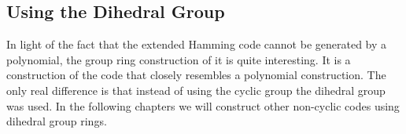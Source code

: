 \subsection{Using the Dihedral Group}
In light of the fact that the extended Hamming code cannot be generated by a polynomial, the group ring construction of it is quite interesting.
It is a construction of the code that closely resembles a polynomial construction.
The only real difference is that instead of using the cyclic group the dihedral group was used.
In the following chapters we will construct other non-cyclic codes using dihedral group rings.